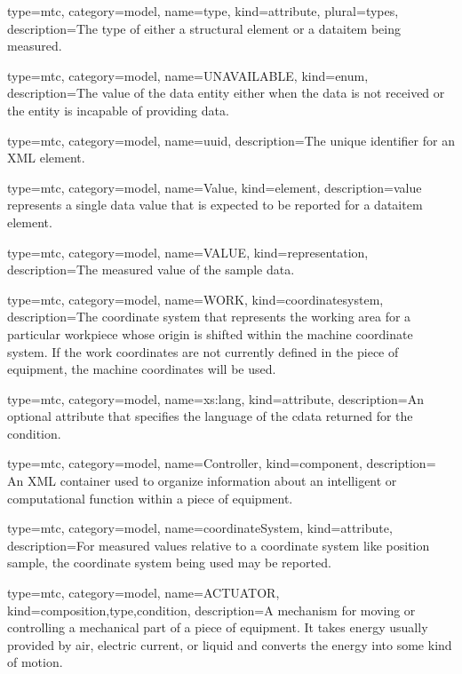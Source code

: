 {
  type=mtc,
  category=model,
  name={type},
  kind={attribute},
  plural={types},
  description={The type of either a \gls{structural element} or a \gls{dataitem} being measured.}
}


{
  type=mtc,
  category=model,
  name={UNAVAILABLE},
  kind={enum},
  description={The value of the \gls{data entity} either when the data is not received or the entity is incapable of providing data.}
}


{
  type=mtc,
  category=model,
  name={uuid},
  description={The unique identifier for an XML element.}
}



{
  type=mtc,
  category=model,
  name={Value},
  kind={element},
  description={\gls{value} represents a single data value that is expected to be reported for a \gls{dataitem} element. }
}


{
  type=mtc,
  category=model,
  name={VALUE},
  kind={representation},
  description={The measured value of the sample data.}
}


{
  type=mtc,
  category=model,
  name={WORK},
  kind={coordinatesystem},
  description={The coordinate system that represents the working area for a particular workpiece whose origin is shifted within the \gls{machine} coordinate system. If the \gls{work} coordinates are not currently defined in the piece of equipment, the \gls{machine} coordinates will be used.}
}


{
  type=mtc,
  category=model,
  name={xs:lang},
  kind={attribute},
  description={An optional attribute that specifies the language of the \gls{cdata} returned for the \gls{condition}.}
}


{
  type=mtc,
  category=model,
  name={Controller},
  kind={component},
  description= {An XML container used to organize information about an intelligent or computational function within a piece of equipment.}
}


{
  type=mtc,
  category=model,
  name={coordinateSystem},
  kind={attribute},
  description={For measured values relative to a coordinate system like \gls{position sample}, the coordinate system being used may be reported.}
}


{
  type=mtc,
  category=model,
  name={ACTUATOR},
  kind={composition,type,condition},
  description={A mechanism for moving or controlling a mechanical part of a piece of equipment.   \newline It takes energy usually provided by air, electric current, or liquid and converts the energy into some kind of motion. }
}


